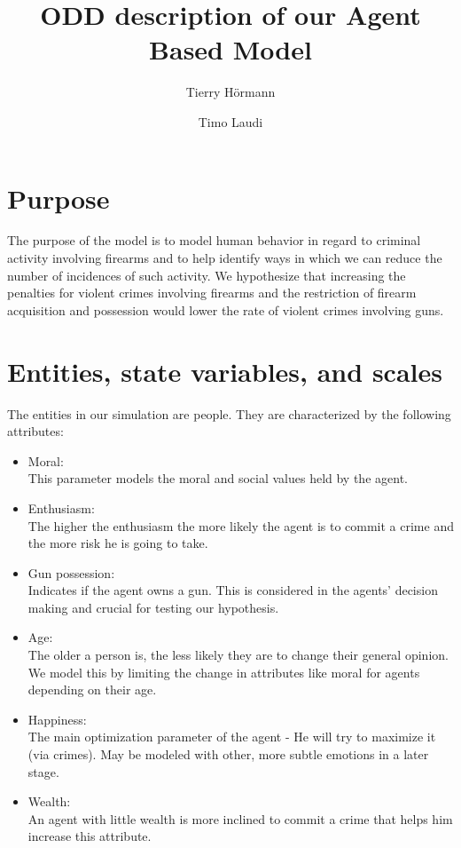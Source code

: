 \documentclass{article}
\title{ODD description of our Agent Based Model}
\author{Tierry H\"ormann \and Timo Laudi}
\begin{document}
	\maketitle

	\section{Purpose}
		The purpose of the model is to model human behavior in regard to criminal activity involving
		firearms and to help identify ways in which we can reduce the number of incidences of such
		activity.
		We hypothesize that increasing the penalties for violent crimes involving firearms and the
		restriction of firearm acquisition and possession would lower the rate of violent crimes
		involving guns.

	\section{Entities, state variables, and scales} \label{entities}
		The entities in our simulation are people. They are characterized by the following attributes:

		\begin{itemize}
			\item Moral:\\
				This parameter models the moral and social values held by the agent.
			\item Enthusiasm:\\
				The higher the enthusiasm the more likely the agent is to commit a crime and the
				more risk he is going to take.
			\item Gun possession:\\
				Indicates if the agent owns a gun. This is considered in the agents' decision
				making and crucial for testing our hypothesis.
			\item Age:\\
				The older a person is, the less likely they are to change their general opinion.
				We model this by limiting the change in attributes like moral for agents depending
				on their age.
			\item Happiness:\\
				The main optimization parameter of the agent - He will try to maximize it (via
				crimes). May be modeled  with other, more subtle emotions in a later stage.
			\item Wealth:\\
				An agent with little wealth is more inclined to commit a crime that helps him
				increase this attribute.
		\end{itemize}
\end{document}
